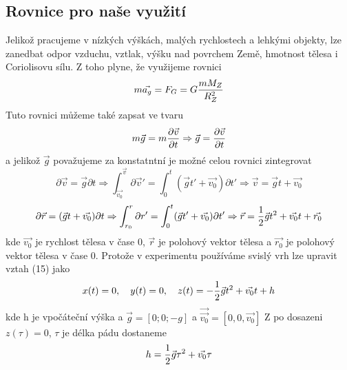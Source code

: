 \documentclass[titlepage]{article}
\begin{document}
        	\subsection{Rovnice pro naše využití}
        		Jelikož pracujeme v nízkých výškách, malých rychlostech a lehkými objekty, lze zanedbat odpor vzduchu, vztlak, výšku nad povrchem Země, hmotnost tělesa i Coriolisovu sílu.
        		Z toho plyne, že využijeme rovnici
        		\begin{equation}
        			m\vec{a_g} = F_G = G{mM_Z \over R_Z^2}
        		\end{equation}
        		Tuto rovnici můžeme také zapsat ve tvaru
        		\begin{equation}
        			m\vec{g} = m{\partial{\vec{v}} \over \partial{t}} \Rightarrow \vec{g} = {\partial{\vec{v}} \over \partial{t}}
        		\end{equation}
        		a jelikož $\vec{g}$ považujeme za konstatntní je možné celou rovnici zintegrovat
        		\begin{equation}
        			\partial{\vec{v}} = \vec{g}\partial{t} \Rightarrow \int_{\vec{v_0}}^{\vec{v}}\partial{\vec{v}'} = \int_0^t(\vec{g}t'+\vec{v_0})\partial{t'} \Rightarrow \vec{v}=\vec{g}t+\vec{v_0}
        		\end{equation}
        		\begin{equation}
        			\partial{\vec{r}} = (\vec{g}t+\vec{v_0})\partial{t} \Rightarrow \int_{r_0}^{r}\partial{r'} = \int_0^t(\vec{g}t'+\vec{v_0})\partial{t'} \Rightarrow \vec{r} = {1 \over 2}\vec{g}t^2+\vec{v_0}t+\vec{r_0}
        		\end{equation}
        		kde $\vec{v_0}$ je rychlost tělesa v čase 0, $\vec{r}$ je polohový vektor tělesa a $\vec{r_0}$ je polohový vektor tělesa v čase 0.\newline
        		Protože v experimentu používáme svislý vrh lze upravit vztah (15) jako
        		\begin{equation}
        			x(t)=0\newline,\quad
        			y(t)=0,\quad
        			z(t)=-{1 \over 2}\vec{g}t^2+\vec{v_0}t+h
        		\end{equation}
        		kde h je vpočáteční výška a $\vec{g} = [0;0;-g]$ a $\vec{\vec{v_0}}=[0,0,\vec{v_0}]$\newline
        		Z po dosazeni $z(\tau)=0$, $\tau$ je délka pádu dostaneme
        		\begin{equation}
        			h = {1 \over 2}\vec{g}\tau^2+\vec{v_0}\tau
        		\end{equation}
\end{document}
